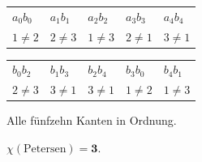 \begin{aufgabe}
\begin{center}
{\small
\renewcommand{\arraystretch}{1.32}
\begin{tabular}{@{}P{1.6cm}P{1.6cm}P{1.6cm}P{1.6cm}P{1.6cm}@{}}
\toprule
$a_0b_0$ & $a_1b_1$ & $a_2b_2$ & $a_3b_3$ & $a_4b_4$\\
$1\neq2$ & $2\neq3$ & $1\neq3$ & $2\neq1$ & $3\neq1$\\
\bottomrule
\end{tabular}}
\end{center}

\begin{center}
{\small
\renewcommand{\arraystretch}{1.32}
\begin{tabular}{@{}P{1.6cm}P{1.6cm}P{1.6cm}P{1.6cm}P{1.6cm}@{}}
\toprule
$b_0b_2$ & $b_1b_3$ & $b_2b_4$ & $b_3b_0$ & $b_4b_1$\\
$2\neq3$ & $3\neq1$ & $3\neq1$ & $1\neq2$ & $1\neq3$\\
\bottomrule
\end{tabular}}
\end{center}

Alle fünfzehn Kanten in Ordnung. \checkmark

$\chi(\text{Petersen}) = \mathbf{3}$.

\begin{center}
\begin{minipage}{0.86\textwidth}
\end{minipage}
\end{center}
\end{aufgabe}

